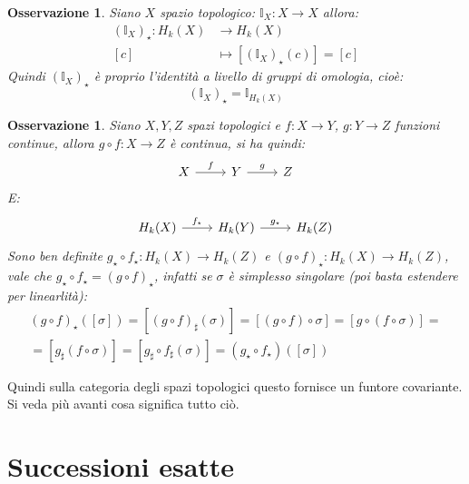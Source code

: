 \documentclass[10pt, twoside=false, x11names]{scrbook}
\newtheorem{osservation}[theorem]{Osservazione}
\newcommand{\Id}[1][]{\mathbb{I}_#1}
\begin{document}

\begin{osservation}
  Siano $ X $ spazio topologico:
  $ \Id{X} \colon X \to X $ allora:
  \begin{align*}
    \left(\Id{X}\right)_\star \colon H_k(X) & \to H_k(X) \\
    [c] & \mapsto [\left(\Id{X}\right)_\star (c)] = [c]
  \end{align*}
  Quindi $ \left(\Id{X}\right)_\star $ è proprio l'identità
  a livello di gruppi di omologia, cioè:
  \[
     \left(\Id{X}\right)_\star = \Id{H_k(X)}
  \]
\end{osservation}

\begin{osservation}
  Siano $ X, Y, Z $ spazi topologici e $ f \colon X \to Y $,
  $ g \colon Y \to Z $ funzioni continue, allora $ g \circ f \colon X \to Z $
  è continua, si ha quindi:
  \[
    \begin{tikzcd}
      X \arrow{r}{f} &  Y  \arrow{r}{g} & Z
    \end{tikzcd}
  \]
  E:
  \[
    \begin{tikzcd}
      H_k(X) \arrow{r}{f_\star} &  H_k(Y) \arrow{r}{g_\star} & H_k(Z)
    \end{tikzcd}
  \]
  Sono ben definite $ g_\star \circ f_\star \colon H_k(X) \to H_k(Z) $ e
  $ \left(g \circ f\right)_\star \colon H_k(X) \to H_k(Z) $, vale che
  $ g_\star \circ f_\star =  \left(g \circ f\right)_\star $, infatti se $ \sigma $ è
  simplesso singolare (poi basta estendere per linearlità):
  \begin{gather*}
    \left(g \circ f\right)_\star ([\sigma]) = [ (g \circ f)_\sharp (\sigma) ] = [ (g \circ f) \circ \sigma ] =  [ g \circ (f \circ \sigma) ] = \\
    = [ g_\sharp (f \circ \sigma)] = [ g_\sharp \circ f_\sharp (\sigma) ] = (g_\star \circ f_\star) ([\sigma])
  \end{gather*}
\end{osservation}
Quindi sulla categoria degli spazi topologici questo
fornisce un funtore covariante. Si veda più avanti
cosa significa tutto ciò.

\section{Successioni esatte}
\end{document}
